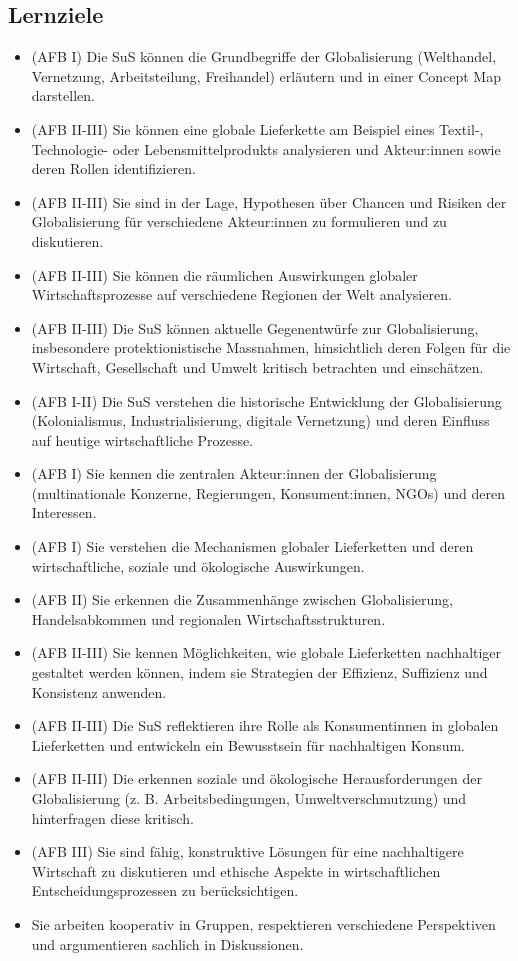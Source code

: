 \subsection{Lernziele}
\begin{itemize}
    \item (AFB I) Die SuS können die Grundbegriffe der Globalisierung (Welthandel, Vernetzung, Arbeitsteilung, Freihandel) erläutern und in einer Concept Map darstellen.
    \item (AFB II-III) Sie können eine globale Lieferkette am Beispiel eines Textil-, Technologie- oder Lebensmittelprodukts analysieren und Akteur:innen sowie deren Rollen identifizieren.
    \item (AFB II-III) Sie sind in der Lage, Hypothesen über Chancen und Risiken der Globalisierung für verschiedene Akteur:innen zu formulieren und zu diskutieren.
    \item (AFB II-III) Sie können die räumlichen Auswirkungen globaler Wirtschaftsprozesse auf verschiedene Regionen der Welt analysieren.
    \item (AFB II-III) Die SuS können aktuelle Gegenentwürfe zur Globalisierung, insbesondere protektionistische Massnahmen, hinsichtlich deren Folgen für die Wirtschaft, Gesellschaft und Umwelt kritisch betrachten und einschätzen.
    \item (AFB I-II) Die SuS verstehen die historische Entwicklung der Globalisierung (Kolonialismus, Industrialisierung, digitale Vernetzung) und deren Einfluss auf heutige wirtschaftliche Prozesse.
    \item (AFB I) Sie kennen die zentralen Akteur:innen der Globalisierung (multinationale Konzerne, Regierungen, Konsument:innen, NGOs) und deren Interessen.
    \item (AFB I) Sie verstehen die Mechanismen globaler Lieferketten und deren wirtschaftliche, soziale und ökologische Auswirkungen.
    \item (AFB II) Sie erkennen die Zusammenhänge zwischen Globalisierung, Handelsabkommen und regionalen Wirtschaftsstrukturen.
    \item (AFB II-III) Sie kennen Möglichkeiten, wie globale Lieferketten nachhaltiger gestaltet werden können, indem sie Strategien der Effizienz, Suffizienz und Konsistenz anwenden.
    \item (AFB II-III) Die SuS reflektieren ihre Rolle als Konsumentinnen in globalen Lieferketten und entwickeln ein Bewusstsein für nachhaltigen Konsum.
    \item (AFB II-III) Die erkennen soziale und ökologische Herausforderungen der Globalisierung (z. B. Arbeitsbedingungen, Umweltverschmutzung) und hinterfragen diese kritisch.
    \item (AFB III) Sie sind fähig, konstruktive Lösungen für eine nachhaltigere Wirtschaft zu diskutieren und ethische Aspekte in wirtschaftlichen Entscheidungsprozessen zu berücksichtigen.
    \item Sie arbeiten kooperativ in Gruppen, respektieren verschiedene Perspektiven und argumentieren sachlich in Diskussionen.
\end{itemize}

